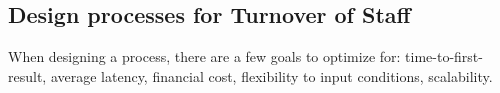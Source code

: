 \subsection{Design processes for Turnover of Staff}


When designing a process, there are a few goals to optimize for: time-to-first-result, average latency, financial cost, flexibility to input conditions, scalability. 